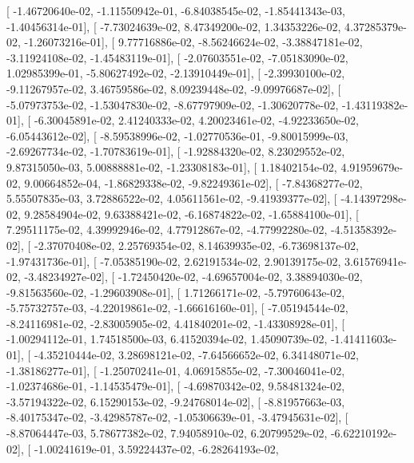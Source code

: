 \documentclass{article}
\begin{document}
       [ -1.46720640e-02,  -1.11550942e-01,  -6.84038545e-02,
         -1.85441343e-03,  -1.40456314e-01],
       [ -7.73024639e-02,   8.47349200e-02,   1.34353226e-02,
          4.37285379e-02,  -1.26073216e-01],
       [  9.77716886e-02,  -8.56246624e-02,  -3.38847181e-02,
         -3.11924108e-02,  -1.45483119e-01],
       [ -2.07603551e-02,  -7.05183090e-02,   1.02985399e-01,
         -5.80627492e-02,  -2.13910449e-01],
       [ -2.39930100e-02,  -9.11267957e-02,   3.46759586e-02,
          8.09239448e-02,  -9.09976687e-02],
       [ -5.07973753e-02,  -1.53047830e-02,  -8.67797909e-02,
         -1.30620778e-02,  -1.43119382e-01],
       [ -6.30045891e-02,   2.41240333e-02,   4.20023461e-02,
         -4.92233650e-02,  -6.05443612e-02],
       [ -8.59538996e-02,  -1.02770536e-01,  -9.80015999e-03,
         -2.69267734e-02,  -1.70783619e-01],
       [ -1.92884320e-02,   8.23029552e-02,   9.87315050e-03,
          5.00888881e-02,  -1.23308183e-01],
       [  1.18402154e-02,   4.91959679e-02,   9.00664852e-04,
         -1.86829338e-02,  -9.82249361e-02],
       [ -7.84368277e-02,   5.55507835e-03,   3.72886522e-02,
          4.05611561e-02,  -9.41939377e-02],
       [ -4.14397298e-02,   9.28584904e-02,   9.63388421e-02,
         -6.16874822e-02,  -1.65884100e-01],
       [  7.29511175e-02,   4.39992946e-02,   4.77912867e-02,
         -4.77992280e-02,  -4.51358392e-02],
       [ -2.37070408e-02,   2.25769354e-02,   8.14639935e-02,
         -6.73698137e-02,  -1.97431736e-01],
       [ -7.05385190e-02,   2.62191534e-02,   2.90139175e-02,
          3.61576941e-02,  -3.48234927e-02],
       [ -1.72450420e-02,  -4.69657004e-02,   3.38894030e-02,
         -9.81563560e-02,  -1.29603908e-01],
       [  1.71266171e-02,  -5.79760643e-02,  -5.75732757e-03,
         -4.22019861e-02,  -1.66616160e-01],
       [ -7.05194544e-02,  -8.24116981e-02,  -2.83005905e-02,
          4.41840201e-02,  -1.43308928e-01],
       [ -1.00294112e-01,   1.74518500e-03,   6.41520394e-02,
          1.45090739e-02,  -1.41411603e-01],
       [ -4.35210444e-02,   3.28698121e-02,  -7.64566652e-02,
          6.34148071e-02,  -1.38186277e-01],
       [ -1.25070241e-01,   4.06915855e-02,  -7.30046041e-02,
         -1.02374686e-01,  -1.14535479e-01],
       [ -4.69870342e-02,   9.58481324e-02,  -3.57194322e-02,
          6.15290153e-02,  -9.24768014e-02],
       [ -8.81957663e-03,  -8.40175347e-02,  -3.42985787e-02,
         -1.05306639e-01,  -3.47945631e-02],
       [ -8.87064447e-03,   5.78677382e-02,   7.94058910e-02,
          6.20799529e-02,  -6.62210192e-02],
       [ -1.00241619e-01,   3.59224437e-02,  -6.28264193e-02,
\end{document}

